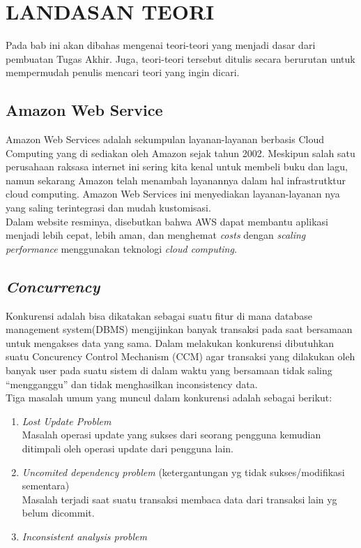 	\chapter{LANDASAN TEORI}
	Pada bab ini akan dibahas mengenai teori-teori yang menjadi dasar dari pembuatan Tugas Akhir. Juga, teori-teori tersebut ditulis secara berurutan untuk mempermudah penulis mencari teori yang ingin dicari.
	
	\section{Amazon Web Service}
	Amazon Web Services adalah sekumpulan layanan-layanan berbasis Cloud Computing yang di sediakan oleh Amazon sejak tahun 2002. Meskipun salah satu perusahaan raksasa internet ini sering kita kenal untuk membeli buku dan lagu, namun sekarang Amazon telah menambah layanannya dalam hal infrastrutktur cloud computing. Amazon Web Services ini menyediakan layanan-layanan nya yang saling terintegrasi dan mudah kustomisasi\cite{wikipedia_amazon_2016}.
	\\ \indent
	Dalam website resminya, disebutkan bahwa AWS dapat membantu aplikasi menjadi lebih cepat, lebih aman, dan menghemat \textit{costs} dengan \textit{scaling} \textit{performance} menggunakan teknologi \textit{cloud computing}\cite{web_services_amazon_nodate}.
	
	\section{\textit{Concurrency}}
	Konkurensi adalah bisa dikatakan sebagai suatu fitur di mana database management system(DBMS) mengijinkan banyak transaksi pada saat bersamaan untuk mengakses data yang sama. Dalam melakukan konkurensi dibutuhkan suatu Concurency Control Mechanism (CCM) agar transaksi yang dilakukan oleh banyak user pada suatu sistem di dalam waktu yang bersamaan tidak saling “mengganggu” dan tidak menghasilkan inconsistency data.
	\\ \indent
	Tiga masalah umum yang muncul dalam konkurensi adalah sebagai berikut: 
	\begin{enumerate}
	    	\item \textit{Lost Update Problem }\\ \indent Masalah operasi update yang sukses dari seorang pengguna kemudian ditimpali oleh operasi update dari pengguna lain.
	    	\item\textit{ Uncomited dependency problem } (ketergantungan yg tidak sukses/modifikasi sementara) \\ \indent
	    	Masalah terjadi saat suatu transaksi membaca data dari transaksi lain yg belum dicommit.
	    	\item \textit{Inconsistent analysis problem} \cite{noauthor_sistem_2013}
	\end{enumerate}   
	
